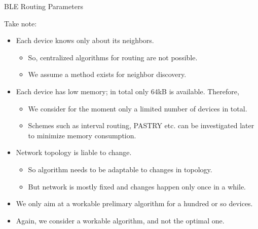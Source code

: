 
\begin{frame}[t,plain]
\titlepage
\end{frame}

\begin{frame}[t]{BLE Routing Parameters}

Take note:

\begin{itemize}
\item Each device knows only about its neighbors.
\begin{itemize}
\item So, centralized algorithms for routing are not possible.  
\item We assume a method exists for neighbor discovery.
\end{itemize}
 
\item Each device has low memory; in total only 64kB is available. Therefore,  
\begin{itemize}
\item We consider for the moment only a limited number of devices in total. 
\item Schemes such as interval routing, PASTRY etc. can be investigated later to minimize memory consumption.  
\end{itemize}
\item Network topology is liable to change. 
\begin{itemize}
\item So algorithm needs to be adaptable to changes in topology. 
\item But network is mostly fixed and changes happen only once in a while.  
\end{itemize}  
\item We only aim at a workable prelimary algorithm for a hundred or so devices.  
\item Again, we consider a workable algorithm, and not the optimal one.  
\end{itemize}
\end{frame}

